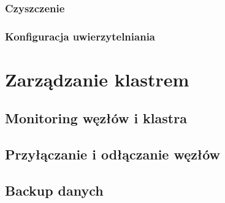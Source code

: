 \documentclass{article} %
\begin{document}
\subsubsection{Czyszczenie}

\subsubsection{Konfiguracja uwierzytelniania}

\section{Zarządzanie klastrem}

\subsection{Monitoring węzłów i klastra}

\subsection{Przyłączanie i odłączanie węzłów}

\subsection{Backup danych}

\pagebreak
\end{document}
